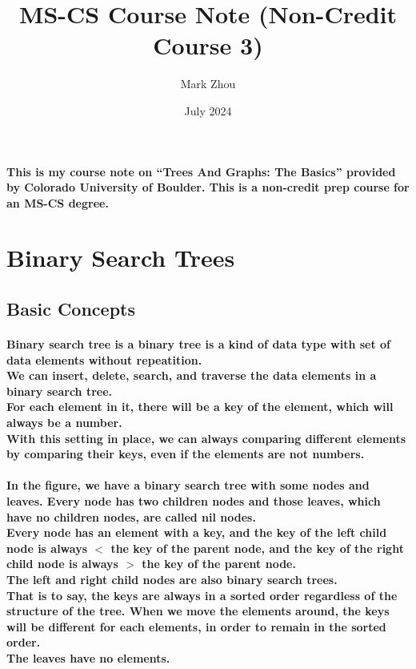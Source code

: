 \documentclass{article}
\title{MS-CS Course Note (Non-Credit Course 3)}
\author{Mark Zhou}
\date{July 2024}
\begin{document}
\maketitle
\doublespacing

\paragraph{This is my course note on “Trees And Graphs: The Basics” provided by Colorado University of Boulder. 
This is a non-credit prep course for an MS-CS degree.}

\newpage
\tableofcontents
\newpage


\section{Binary Search Trees}

\subsection{Basic Concepts}

\paragraph{
    Binary search tree is a binary tree is a kind of data type with set of data elements without repeatition.\\
    We can insert, delete, search, and traverse the data elements in 
    a binary search tree.\\
    For each element in it, there will be a key of the element, which will 
    always be a number.\\
    With this setting in place, we can always comparing different elements 
    by comparing their keys, even if the elements are not numbers.\\
}

\paragraph{
    In the figure, we have a binary search tree with some nodes and 
    leaves. Every node has two children nodes and those leaves, which 
    have no children nodes, are called nil nodes.\\
    Every node has an element with a key, and the key of the left child
    node is always $<$ the key of the parent node, and the key of
    the right child node is always $>$ the key of the parent node.\\
    The left and right child nodes are also binary search trees.\\
    That is to say, the keys are always in a sorted order regardless of
    the structure of the tree. When we move the elements around, the keys 
    will be different for each elements, in order to remain in the sorted 
    order.\\
    The leaves have no elements.\\
}
\end{document}
